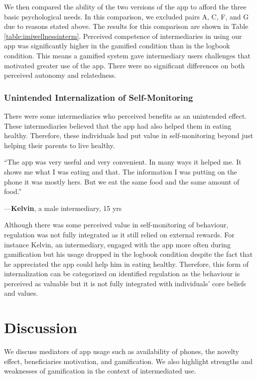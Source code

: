 \documentclass{sig-alternate}
\newenvironment{myquote}
               {\list{}{\rightmargin   \leftmargin
                        \parsep        0in }%
                \item\relax}
               {\endlist}
\newcommand{\userquote}[2]{\begin{samepage}\begin{myquote} 
     \em{\small{#2\begin{flushright}---#1\end{flushright}}}
   \end{myquote}\end{samepage}}
\begin{document}
We then compared the ability of the two versions of the app to afford the three basic psychological needs. In this comparison, we excluded pairs A, C, F, and G due to reasons stated above. The results for this comparison are shown in Table \ref{table:imiwellnessinterm}. Perceived competence of intermediaries in using our app was significantly higher in the gamified condition than in the logbook condition. This means a gamified system gave intermediary users challenges that motivated greater use of the app. There were no significant differences on both perceived autonomy and relatedness. 
\subsubsection{Unintended Internalization of Self-Monitoring}
There were some intermediaries who perceived benefits as an unintended effect. These intermediaries believed that the app had also helped them in eating healthy. Therefore, these individuals had put value in self-monitoring beyond just helping their parents to live healthy. 

\userquote{\textbf{Kelvin}, a male intermediary, 15 yrs} {``The app was very useful and very convenient. In many ways it helped me.  It shows me what I was eating and that. The information I was putting on the phone it was mostly hers. But we eat the same food and the same amount of food.''} 

Although there was some perceived value in self-monitoring of behaviour, regulation was not fully integrated as it still relied on external rewards. For instance Kelvin, an intermediary, engaged with the app more often during gamification but his usage dropped in the logbook condition despite the fact that he appreciated the app could help him in eating healthy. Therefore, this form of internalization can be categorized on identified regulation as the behaviour is perceived as valuable but it is not fully integrated with individuals' core beliefs and values.

\section{Discussion}
We discuss mediators of app usage such as availability of phones, the novelty effect, beneficiaries motivation, and gamification. We also highlight strengths and weaknesses of gamification in the context of intermediated use.
\end{document}
